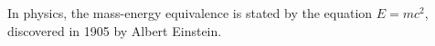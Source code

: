 \documentclass{article}
\begin{document}
    In physics, the mass-energy equivalence is stated 
    by the equation $E=mc^2$, discovered in 1905 by Albert Einstein.
\end{document}
